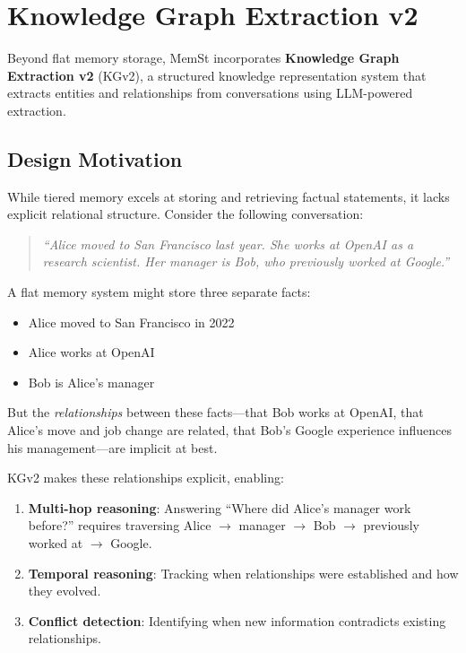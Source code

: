 \section{Knowledge Graph Extraction v2}
\label{sec:kg_extraction}

Beyond flat memory storage, MemSt incorporates \textbf{Knowledge Graph Extraction v2} (KGv2), a structured knowledge representation system that extracts entities and relationships from conversations using LLM-powered extraction.

\subsection{Design Motivation}

While tiered memory excels at storing and retrieving factual statements, it lacks explicit relational structure. Consider the following conversation:

\begin{quote}
\textit{``Alice moved to San Francisco last year. She works at OpenAI as a research scientist. Her manager is Bob, who previously worked at Google.''}
\end{quote}

A flat memory system might store three separate facts:
\begin{itemize}
    \item Alice moved to San Francisco in 2022
    \item Alice works at OpenAI
    \item Bob is Alice's manager
\end{itemize}

But the \textit{relationships} between these facts---that Bob works at OpenAI, that Alice's move and job change are related, that Bob's Google experience influences his management---are implicit at best.

KGv2 makes these relationships explicit, enabling:
\begin{enumerate}
    \item \textbf{Multi-hop reasoning}: Answering ``Where did Alice's manager work before?'' requires traversing Alice $\rightarrow$ manager $\rightarrow$ Bob $\rightarrow$ previously worked at $\rightarrow$ Google.
    \item \textbf{Temporal reasoning}: Tracking when relationships were established and how they evolved.
    \item \textbf{Conflict detection}: Identifying when new information contradicts existing relationships.
\end{enumerate}

